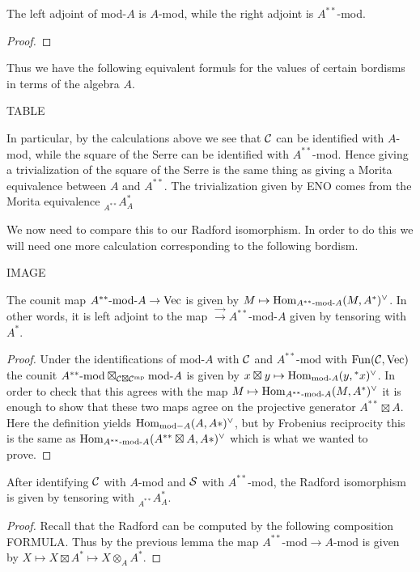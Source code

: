 \documentclass{amsart}
\begin{document}
\begin{lemma}
The left adjoint of mod-$A$ is $A$-mod, while the right adjoint is $A^{**}$-mod.
\end{lemma}
\begin{proof}
\end{proof}

Thus we have the following equivalent formuls for the values of certain bordisms in terms of the algebra $A$.

TABLE

In particular, by the calculations above we see that $\cC$ can be identified with $A$-mod, while the square of the Serre can be identified with $A^{**}$-mod.  Hence giving a trivialization of the square of the Serre is the same thing as giving a Morita equivalence between $A$ and $A^{**}$.  The trivialization given by ENO comes from the Morita equivalence ${}_{A^{**}} A^*_{A}$

We now need to compare this to our Radford isomorphism.  In order to do this we will need one more calculation corresponding to the following bordism.

IMAGE

\begin{lemma}
The counit map $A^{**}\text{-mod-}A \rightarrow \Vec$ is given by $M \mapsto \Hom_{A^{**}\text{-mod-}A}(M, A^*)^\vee$.  In other words, it is left adjoint to the map $\Vec \rightarrow A^{**}\text{-mod-}A$ given by tensoring with $A^*$.
\end{lemma}
\begin{proof}
Under the identifications of $\text{mod-}A$ with $\cC$ and $A^{**}\text{-mod}$ with $\Fun(\cC, \Vec)$ the counit $A^{**}\text{-mod} \boxtimes_{\cC \boxtimes \cC^\mp} \text{mod-}A$ is given by $x \boxtimes y \mapsto \Hom_{\text{mod-}A}(y, {}^*x)^\vee$.  In order to check that this agrees with the map $M \mapsto \Hom_{A^{**}\text{-mod-}A}(M, A^*)^\vee$ it is enough to show that these two maps agree on the projective generator $A^{**} \boxtimes A$.  Here the definition yields $\Hom_{\text{mod}-A}(A, A*)^\vee$, but by Frobenius reciprocity this is the same as $\Hom_{A^{**}\text{-mod-}A}(A^{**} \boxtimes A, A*)^\vee$ which is what we wanted to prove.
\end{proof}


\begin{lemma}
After identifying $\cC$ with $A$-mod and $\cS$ with $A^{**}$-mod, the Radford isomorphism is given by tensoring with ${}_{A^{**}} A^*_{A}$.
\end{lemma}
\begin{proof}
Recall that the Radford can be computed by the following composition FORMULA.  Thus by the previous lemma the map $A^{**}\text{-mod} \rightarrow A\text{-mod}$ is given by $X \mapsto X \boxtimes A^* \mapsto X \otimes_A A^*$.
\end{proof}
\end{document}
